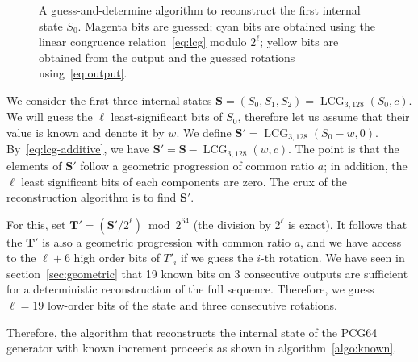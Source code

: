 \documentclass[preprint,svgnames]{iacrtrans}
\DeclareMathOperator{\LCG}{LCG}
\begin{document}
\begin{figure}
\begin{center}
\end{center}
\caption{A guess-and-determine algorithm to reconstruct the first internal state
  $S_0$. Magenta bits are guessed; cyan bits are obtained using the linear
  congruence relation~\eqref{eq:lcg} modulo $2^\ell$; yellow bits are obtained
  from the output and the guessed rotations using~\eqref{eq:output}.}
\label{fig:Cknown}
\end{figure}

We consider the first three internal states
$\mathbf{S} = (S_0, S_1, S_2) = \LCG_{3, 128}(S_0, c)$. We will guess the $\ell$
least-significant bits of $S_0$, therefore let us assume that their value is
known and denote it by $w$. We define $\mathbf{S}' = \LCG_{3, 128}(S_0 - w,
0)$. By~\eqref{eq:lcg-additive}, we have
$\mathbf{S}' = \mathbf{S} - \LCG_{3, 128}(w, c)$. The point is that the elements
of $\mathbf{S}'$ follow a geometric progression of common ratio $a$; in
addition, the $\ell$ least significant bits of each components are zero. The
crux of the reconstruction algorithm is to find $\mathbf{S}'$.

For this, set $\mathbf{T}' = \left(\mathbf{S}' / 2^\ell\right) \bmod 2^{64}$
(the division by $2^\ell$ is exact). It follows that the $\mathbf{T}'$ is also a
geometric progression with common ratio $a$, and we have access to the $\ell+6$
high order bits of $T'_i$ if we guess the $i$-th rotation. We have seen in
section~\ref{sec:geometric} that 19 known bits on 3 consecutive outputs are
sufficient for a deterministic reconstruction of the full sequence. Therefore,
we guess $\ell = 19$ low-order bits of the state and three consecutive
rotations.

Therefore, the algorithm that reconstructs the internal state of the
\textsf{PCG64} generator with known increment proceeds as shown in algorithm~\ref{algo:known}.
\end{document}
